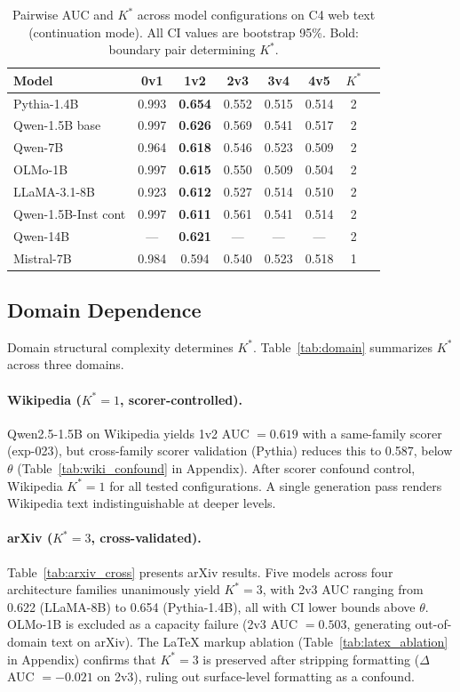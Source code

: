 \documentclass[11pt]{article}
\begin{document}
\begin{table}[t]
\centering
\caption{Pairwise AUC and $K^*$ across model configurations on C4 web text (continuation mode). All CI values are bootstrap 95\%. Bold: boundary pair determining $K^*$.}
\label{tab:main_c4}
\small
\begin{tabular}{lccccccc}
\toprule
Model & 0v1 & \textbf{1v2} & 2v3 & 3v4 & 4v5 & $K^*$ \\
\midrule
Pythia-1.4B & 0.993 & \textbf{0.654} & 0.552 & 0.515 & 0.514 & 2 \\
Qwen-1.5B base & 0.997 & \textbf{0.626} & 0.569 & 0.541 & 0.517 & 2 \\
Qwen-7B & 0.964 & \textbf{0.618} & 0.546 & 0.523 & 0.509 & 2 \\
OLMo-1B & 0.997 & \textbf{0.615} & 0.550 & 0.509 & 0.504 & 2 \\
LLaMA-3.1-8B & 0.923 & \textbf{0.612} & 0.527 & 0.514 & 0.510 & 2 \\
Qwen-1.5B-Inst cont & 0.997 & \textbf{0.611} & 0.561 & 0.541 & 0.514 & 2 \\
Qwen-14B & --- & \textbf{0.621} & --- & --- & --- & 2 \\
\midrule
Mistral-7B & 0.984 & 0.594 & 0.540 & 0.523 & 0.518 & 1 \\
\bottomrule
\end{tabular}
\end{table}

\subsection{Domain Dependence}
\label{sec:domain}

Domain structural complexity determines $K^*$. Table~\ref{tab:domain} summarizes $K^*$ across three domains.

\paragraph{Wikipedia ($K^*{=}1$, scorer-controlled).} Qwen2.5-1.5B on Wikipedia yields 1v2 AUC $= 0.619$ with a same-family scorer (exp-023), but cross-family scorer validation (Pythia) reduces this to 0.587, below $\theta$ (Table~\ref{tab:wiki_confound} in Appendix). After scorer confound control, Wikipedia $K^* = 1$ for all tested configurations. A single generation pass renders Wikipedia text indistinguishable at deeper levels.

\paragraph{arXiv ($K^*{=}3$, cross-validated).} Table~\ref{tab:arxiv_cross} presents arXiv results. Five models across four architecture families unanimously yield $K^* = 3$, with 2v3 AUC ranging from 0.622 (LLaMA-8B) to 0.654 (Pythia-1.4B), all with CI lower bounds above $\theta$. OLMo-1B is excluded as a capacity failure (2v3 AUC $= 0.503$, generating out-of-domain text on arXiv). The LaTeX markup ablation (Table~\ref{tab:latex_ablation} in Appendix) confirms that $K^* = 3$ is preserved after stripping formatting ($\Delta$AUC $= -0.021$ on 2v3), ruling out surface-level formatting as a confound.
\end{document}
